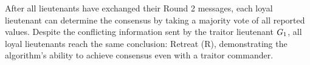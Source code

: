 \par\vspace{0.3em}
{\scriptsize
After all lieutenants have exchanged their Round 2 messages, each loyal lieutenant can determine the consensus by taking a majority vote of all reported values. Despite the conflicting information sent by the traitor lieutenant $G_{1}$, all loyal lieutenants reach the same conclusion: Retreat (R), demonstrating the algorithm's ability to achieve consensus even with a traitor commander.
}
